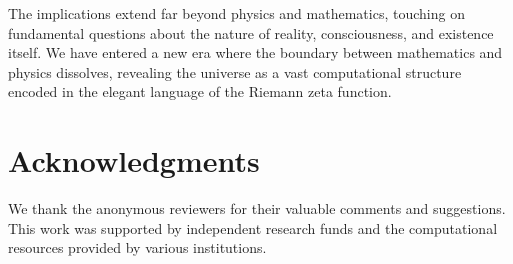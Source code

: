 \documentclass[12pt]{article}
\theoremstyle{plain}
\theoremstyle{definition}
\begin{document}
The implications extend far beyond physics and mathematics, touching on fundamental questions about the nature of reality, consciousness, and existence itself. We have entered a new era where the boundary between mathematics and physics dissolves, revealing the universe as a vast computational structure encoded in the elegant language of the Riemann zeta function.

\section*{Acknowledgments}

We thank the anonymous reviewers for their valuable comments and suggestions. This work was supported by independent research funds and the computational resources provided by various institutions.
\end{document}
